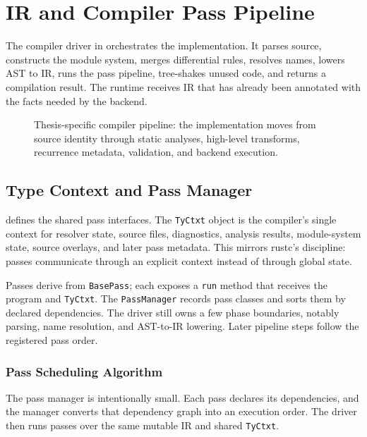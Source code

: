 \chapter{IR and Compiler Pass Pipeline}

The compiler driver in  orchestrates
the implementation. It parses source, constructs the module system, merges
differential rules, resolves names, lowers AST to IR, runs the pass pipeline,
tree-shakes unused code, and returns a compilation result. The runtime receives
IR that has already been annotated with the facts needed by the backend.

\begin{figure}[p]
\centering
\resizebox{\textwidth}{!}{}
\caption{Thesis-specific compiler pipeline: the implementation moves from
source identity through static analyses, high-level transforms, recurrence
metadata, validation, and backend execution.}
\label{fig:pipeline}
\end{figure}

\section{Type Context and Pass Manager}

 defines the shared pass interfaces. The
\texttt{TyCtxt} object is the compiler's single context for resolver state,
source files, diagnostics, analysis results, module-system state, source
overlays, and later pass metadata. This mirrors rustc's discipline: passes
communicate through an explicit context instead of through global state.

Passes derive from \texttt{BasePass}; each exposes a \texttt{run} method that
receives the program and \texttt{TyCtxt}. The \texttt{PassManager} records pass
classes and sorts them by declared dependencies. The driver still owns a few
phase boundaries, notably parsing, name resolution, and AST-to-IR lowering.
Later pipeline steps follow the registered pass order.

\subsection{Pass Scheduling Algorithm}

The pass manager is intentionally small. Each pass declares its dependencies,
and the manager converts that dependency graph into an execution order. The
driver then runs passes over the same mutable IR and shared \texttt{TyCtxt}.

